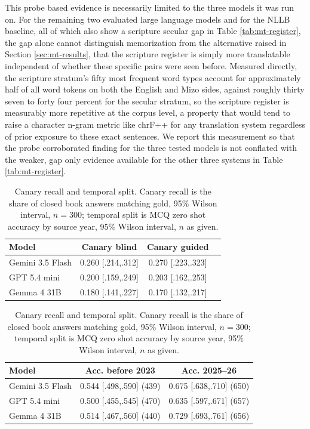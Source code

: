 \documentclass[pdflatex,sn-mathphys-ay]{sn-jnl}
\begin{document}
This probe based evidence is necessarily limited to the three models it was run on. For the remaining two evaluated large language models and for the NLLB baseline, all of which also show a scripture secular gap in Table \ref{tab:mt-register}, the gap alone cannot distinguish memorization from the alternative raised in Section \ref{sec:mt-results}, that the scripture register is simply more translatable independent of whether these specific pairs were seen before. Measured directly, the scripture stratum's fifty most frequent word types account for approximately half of all word tokens on both the English and Mizo sides, against roughly thirty seven to forty four percent for the secular stratum, so the scripture register is measurably more repetitive at the corpus level, a property that would tend to raise a character n-gram metric like chrF++ for any translation system regardless of prior exposure to these exact sentences. We report this measurement so that the probe corroborated finding for the three tested models is not conflated with the weaker, gap only evidence available for the other three systems in Table \ref{tab:mt-register}.

\begin{table}[t]
\centering
\small
\begin{tabular}{lccc}
\toprule
\textbf{Model} & \textbf{Canary blind} & \textbf{Canary guided} \\
\midrule
Gemini 3.5 Flash & 0.260 [.214,.312] & 0.270 [.223,.323] \\
GPT 5.4 mini & 0.200 [.159,.249] & 0.203 [.162,.253] \\
Gemma 4 31B & 0.180 [.141,.227] & 0.170 [.132,.217] \\
\bottomrule
\end{tabular}
\vspace{0.3em}
\begin{tabular}{lcc}
\textbf{Model} & \textbf{Acc. before 2023} & \textbf{Acc. 2025--26} \\
\midrule
Gemini 3.5 Flash & 0.544 [.498,.590] (439) & 0.675 [.638,.710] (650) \\
GPT 5.4 mini & 0.500 [.455,.545] (470) & 0.635 [.597,.671] (657) \\
Gemma 4 31B & 0.514 [.467,.560] (440) & 0.729 [.693,.761] (656) \\
\bottomrule
\end{tabular}
\caption{Canary recall and temporal split. Canary recall is the share of closed book answers matching gold, 95\% Wilson interval, $n{=}300$; temporal split is MCQ zero shot accuracy by source year, 95\% Wilson interval, $n$ as given.}
\label{tab:canary-temporal}
\end{table}
\end{document}
